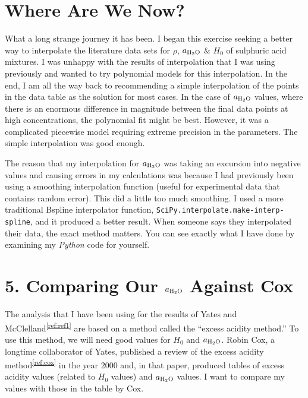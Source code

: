 \documentclass[]{tufte-handout}
\newcommand{\tss}[1]{\textsuperscript{#1}}
\begin{document}
\section{Where Are We Now?}

What a long strange journey it has been. I began this exercise seeking a better way to interpolate the literature data sets for $\rho$, $a_{\ce{H2O}}$ \& $H_0$ of sulphuric acid mixtures. I was unhappy with the results of interpolation that I was using previously and wanted to try polynomial models for this interpolation. In the end, I am all the way back to recommending a simple interpolation of the points in the data table as the solution for most cases. In the case of $a_{\ce{H2O}}$ values, where there is an enormous difference in magnitude between the final data points at high concentrations, the polynomial fit might be best. However, it was a complicated piecewise model requiring extreme precision in the parameters. The simple interpolation was good enough.

The reason that my interpolation for $a_{\ce{H2O}}$ was taking an excursion into negative values and causing errors in my calculations was because I had previously been using a smoothing interpolation function (useful for experimental data that contains random error). This did a little too much smoothing. I used a more traditional Bspline interpolator function, \texttt{SciPy.interpolate.\-make-interp-spline}, and it produced a better result. When someone says they interpolated their data, the exact method matters. You can see exactly what I have done by examining my \textit{Python} code for yourself.

\section{5. Comparing Our $a_{\ce{H2O}}$ Against Cox}

The analysis that I have been using for the results of Yates and McClelland\tss{\ref{ref:ref1}} are based on a method called the ``excess acidity method.'' To use this method, we will need good values for $H_0$ and $a_{\ce{H2O}}$. Robin Cox, a longtime collaborator of Yates, published a review of the excess acidity method\tss{\ref{ref:cox}} in the year 2000 and, in that paper, produced tables of excess acidity values (related to $H_0$ values) and $a_{\ce{H2O}}$ values. I want to compare my values with those in the table by Cox.
\end{document}
